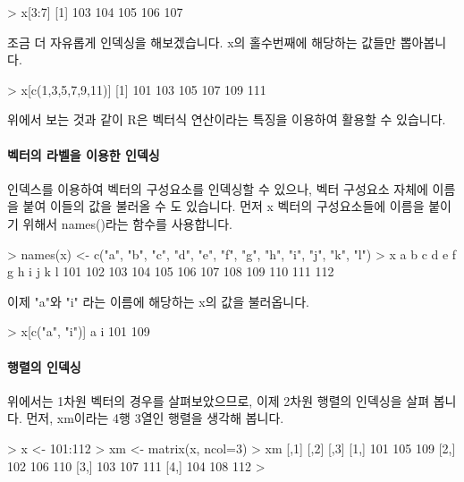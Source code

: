 \documentclass{book}
\begin{document}
\begin{Schunk}
\begin{Soutput}
> x[3:7]
[1] 103 104 105 106 107
\end{Soutput}
\end{Schunk}

조금 더 자유롭게 인덱싱을 해보겠습니다. 
x의 홀수번째에 해당하는 값들만 뽑아봅니다. 

\begin{Schunk}
\begin{Soutput}
> x[c(1,3,5,7,9,11)]
[1] 101 103 105 107 109 111
\end{Soutput}
\end{Schunk}

위에서 보는 것과 같이 R은 벡터식 연산이라는 특징을 이용하여 활용할 수 있습니다.

\paragraph{벡터의 라벨을 이용한 인덱싱} 
인덱스를 이용하여 벡터의 구성요소를 인덱싱할 수 있으나, 벡터 구성요소 자체에 이름을 붙여 이들의 값을 불러올 수 도 있습니다. 
먼저 x 벡터의 구성요소들에 이름을 붙이기 위해서 names()라는 함수를 사용합니다. 

\begin{Schunk}
\begin{Soutput}
> names(x) <- c("a", "b", "c", "d", "e", "f", "g", "h", "i", "j", "k", "l")
> x
  a   b   c   d   e   f   g   h   i   j   k   l 
101 102 103 104 105 106 107 108 109 110 111 112 
\end{Soutput}
\end{Schunk}

이제 "a"와 "i" 라는 이름에 해당하는 x의 값을 불러옵니다. 

\begin{Schunk}
\begin{Soutput}
> x[c("a", "i")]
  a   i 
101 109 
\end{Soutput}
\end{Schunk}

\paragraph{행렬의 인덱싱} 
위에서는 1차원 벡터의 경우를 살펴보았으므로, 이제 2차원 행렬의 인덱싱을 살펴 봅니다. 
먼저, xm이라는 4행 3열인 행렬을 생각해 봅니다. 

\begin{Schunk}
\begin{Soutput}
> x <- 101:112
> xm <- matrix(x, ncol=3)
> xm
     [,1] [,2] [,3]
[1,]  101  105  109
[2,]  102  106  110
[3,]  103  107  111
[4,]  104  108  112
> 
\end{Soutput}
\end{Schunk}
\end{document}
